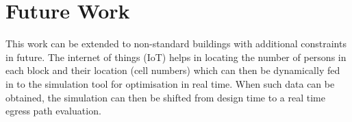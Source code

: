 \section{Future Work}

This work can be extended to non-standard buildings with additional constraints in future. The internet of things (IoT) helps in locating the number of persons in each block and their location (cell numbers) which can then be dynamically fed in to the simulation tool for optimisation in real time. When such data can be obtained, the simulation can then be shifted from design time to a real time egress path evaluation. 


 
